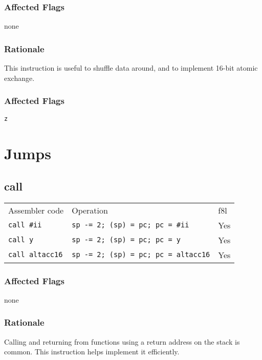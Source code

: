 \documentclass{book}
\begin{document}
\subsubsection*{Affected Flags}

none

\subsubsection*{Rationale}

This instruction is useful to shuffle data around, and to implement 16-bit atomic exchange.


\subsubsection*{Affected Flags}

\texttt{z}


\section{Jumps}

\subsection{call}

\begin{tabular}{l l l}
Assembler code         & Operation                                  & f8l \\
\texttt{call \#ii}     & \texttt{sp -= 2; (sp) = pc; pc = \#ii}     & Yes \\
\texttt{call y}        & \texttt{sp -= 2; (sp) = pc; pc = y}        & Yes \\
\texttt{call altacc16} & \texttt{sp -= 2; (sp) = pc; pc = altacc16} & Yes \\
\end{tabular}

\subsubsection*{Affected Flags}

none

\subsubsection*{Rationale}

Calling and returning from functions using a return address on the stack is common. This instruction helps implement it efficiently.
\end{document}
